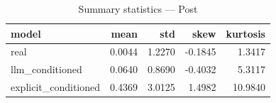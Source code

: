 \begin{table}
\caption{Summary statistics — Post}
\label{tab:summary_Post}
\begin{tabular}{lrrrr}
\toprule
model & mean & std & skew & kurtosis \\
\midrule
real & 0.0044 & 1.2270 & -0.1845 & 1.3417 \\
llm\_conditioned & 0.0640 & 0.8690 & -0.4032 & 5.3117 \\
explicit\_conditioned & 0.4369 & 3.0125 & 1.4982 & 10.9840 \\
\bottomrule
\end{tabular}
\end{table}
